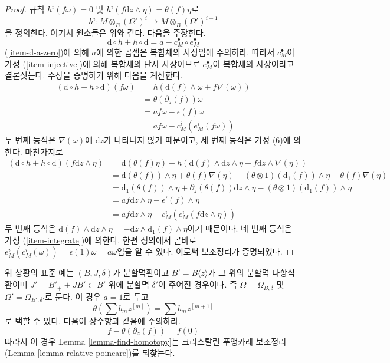 \begin{proof}
\medskip\noindent
규칙 $h^i(f \omega) = 0$ 및
$h^i(f \text{d}z \wedge \eta) = \theta(f) \eta$로
$$
h^i : M \otimes_B (\Omega')^i \longrightarrow M \otimes_B (\Omega')^{i - 1}
$$
을 정의한다. 여기서 원소들은 위와 같다. 다음을 주장한다.
$$
\text{d} \circ h + h \circ \text{d} = a - c_M^\bullet \circ e_M^\bullet
$$
(\ref{item-d-a-zero})에 의해 $a$에 의한 곱셈은 복합체의 사상임에
주의하라. 따라서 $c_M^\bullet$이 가정 (\ref{item-injective})에 의해
복합체의 단사 사상이므로 $e_M^\bullet$이 복합체의 사상이라고
결론짓는다. 주장을 증명하기 위해 다음을 계산한다.
\begin{align*}
(\text{d} \circ h + h \circ \text{d})(f \omega)
& =
h\left(\text{d}(f) \wedge \omega + f \nabla(\omega)\right)
\\
& =
\theta(\partial_z(f)) \omega
\\
& =
a f\omega - \epsilon(f)\omega 
\\
& =
a f \omega - c^i_M(e^i_M(f\omega))
\end{align*}
두 번째 등식은 $\nabla(\omega)$에 $\text{d}z$가 나타나지 않기
때문이고, 세 번째 등식은 가정 (6)에 의한다. 마찬가지로
\begin{align*}
(\text{d} \circ h + h \circ \text{d})(f \text{d}z \wedge \eta)
& =
\text{d}(\theta(f) \eta) +
h\left(\text{d}(f) \wedge \text{d}z \wedge \eta -
f \text{d}z \wedge \nabla(\eta)\right)
\\
& =
\text{d}(\theta(f)) \wedge \eta + \theta(f) \nabla(\eta)
- (\theta \otimes 1)(\text{d}_1(f)) \wedge \eta
- \theta(f) \nabla(\eta)
\\
& =
\text{d}_1(\theta(f)) \wedge \eta +
\partial_z(\theta(f)) \text{d}z \wedge \eta -
(\theta \otimes 1)(\text{d}_1(f)) \wedge \eta
\\
& =
a f \text{d}z \wedge \eta - \epsilon'(f) \wedge \eta \\
& = a f \text{d}z \wedge \eta - c^i_M(e^i_M(f \text{d}z \wedge \eta))
\end{align*}
두 번째 등식은
$\text{d}(f) \wedge \text{d}z \wedge \eta =
- \text{d}z \wedge \text{d}_1(f) \wedge \eta$이기 때문이다.
네 번째 등식은 가정 (\ref{item-integrate})에 의한다. 한편 정의에서
곧바로 $e^i_M(c^i_M(\omega)) = \epsilon(1) \omega = a \omega$임을
알 수 있다. 이로써 보조정리가 증명되었다.
\end{proof}

\begin{example}
\label{example-integrate}
위 상황의 표준 예는 $(B, J, \delta)$가 분할멱환이고
$B' = B\langle z \rangle$가 그 위의 분할멱 다항식환이며
$J' = B'_{+} + JB' \subset B'$ 위에 분할멱 $\delta'$이 주어진 경우이다.
즉 $\Omega = \Omega_{B, \delta}$ 및
$\Omega' = \Omega_{B', \delta'}$로 둔다. 이 경우 $a = 1$로 두고
$$
\theta( \sum b_m z^{[m]} ) = \sum b_m z^{[m + 1]}
$$
로 택할 수 있다. 다음이 상수항과 같음에 주의하라.
$$
f - \theta(\partial_z(f)) = f(0)
$$
따라서 이 경우 Lemma \ref{lemma-find-homotopy}는 크리스탈린
푸앵카레 보조정리(Lemma \ref{lemma-relative-poincare})를 되찾는다.
\end{example}

